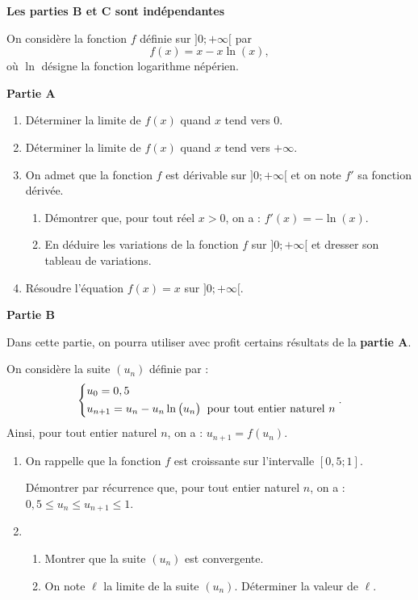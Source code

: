 \textbf{Les parties B et C sont indépendantes}

\medskip

On considère la fonction $f$  définie sur $]0;+\infty[$ par \[f(x) = x - x \ln (x),\] où $\ln$ désigne la fonction logarithme népérien. 

\medskip

\textbf{Partie A}

\begin{enumerate}
	\item Déterminer la limite de $f(x)$ quand $x$ tend vers $0$.
	\item Déterminer la limite de $f(x)$ quand $x$ tend vers $+\infty$.
	\item On admet que la fonction $f$ est dérivable sur $]0;+\infty[$ et on note $f'$ sa fonction dérivée.
	\begin{enumerate}
		\item Démontrer que, pour tout réel $x > 0$, on a : $f'(x) = - \ln (x)$.
		\item En déduire les variations de la fonction $f$ sur $]0;+\infty[$ et dresser son tableau de variations.
	\end{enumerate}
	\item Résoudre l'équation $f(x) = x$ sur $]0;+\infty[$.
\end{enumerate}

\medskip

\textbf{Partie B}

\medskip

Dans cette partie, on pourra utiliser avec profit certains résultats de la \textbf{partie A}. 

On considère la suite $\left(u_n\right)$ définie par : \[\begin{dcases} u_0 = 0,5 \\ u_{n+1} =  u_n - u_n \ln \big(u_n\big) \:\text{ pour tout entier naturel } n \end{dcases}.\]
%
Ainsi, pour tout entier naturel $n$, on a : $u_{n+1} = f\left(u_n\right)$.

\begin{enumerate}
	\item On rappelle que la fonction $f$ est croissante sur l'intervalle $[0,5;1]$.
	
	Démontrer par récurrence que, pour tout entier naturel $n$, on a : $0,5 \leqslant  u_n \leqslant u_{n+1} \leqslant 1$.
	\item 
	\begin{enumerate}
		\item Montrer que la suite $\left(u_n\right)$ est convergente.
		\item On note $\ell$ la limite de la suite $\left(u_n\right)$. Déterminer la valeur de $\ell$.
	\end{enumerate}
\end{enumerate}

